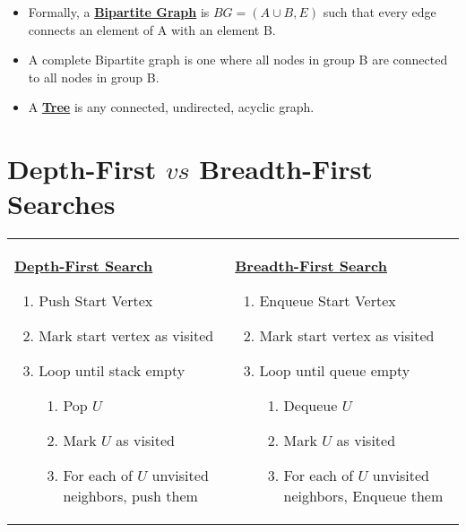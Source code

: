\documentclass[12pt]{article}
\newcommand{\definition}[1]{\underline{\textbf{#1}}}
\begin{document}
\begin{itemize}
    \item Formally, a \definition{Bipartite Graph} is $BG = (A \cup B, E)$ such that every edge connects an element of A with an element B.
    
    \item A complete Bipartite graph is one where all nodes in group B are connected to all nodes in group B.

    \item A \definition{Tree} is any connected, undirected, acyclic graph.

\end{itemize}

\pagebreak

\section*{Depth-First $vs$ Breadth-First Searches}

\begin{tabularx}{\textwidth}{X X}

    \definition{Depth-First Search}

    \begin{enumerate}

        \item Push Start Vertex
        \item Mark start vertex as visited
        \item Loop until stack empty
        \begin{enumerate}
            \item Pop $U$
            \item Mark $U$ as visited
            \item For each of $U$ unvisited neighbors, push them
        \end{enumerate}

    \end{enumerate}

    &

    \definition{Breadth-First Search}

    \begin{enumerate}

        \item Enqueue Start Vertex
        \item Mark start vertex as visited
        \item Loop until queue empty
        \begin{enumerate}
            \item Dequeue $U$
            \item Mark $U$ as visited
            \item For each of $U$ unvisited neighbors, Enqueue them
        \end{enumerate}

    \end{enumerate}

\end{tabularx}
\end{document}
